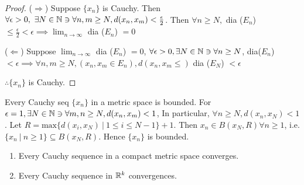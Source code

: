 \begin{proof}
	($\Rightarrow$) Suppose $\{x_n\}$ is Cauchy. Then $\forall \epsilon > 0,~\exists N \in \mathbb{N} \ni \forall n,m \geq N, d(x_n,x_m) < \frac{\epsilon}{2}$. Then $\forall n \geq N,$ dia ($E_n$) $\leq \frac{\epsilon}{2} < \epsilon \implies \lim_{n \rightarrow \infty}$ dia ($E_n$) $= 0$
	
	($\Leftarrow$) Suppose $\lim_{n \rightarrow \infty}$ dia ($E_n$) $= 0$, $\forall \epsilon > 0 ,\exists N \in \mathbb{N} \ni \forall n \geq N$, dia($E_n$) $< \epsilon \implies \forall n,m \geq N, (x_n,x_m \in E_n), d(x_n,x_m \leq )$ dia ($E_N$) $< \epsilon$ 
	
	$\therefore \{x_n\}$ is Cauchy.
\end{proof}

\begin{rmk*}
	Every Cauchy seq $\{x_n\}$ in a metric space is bounded. For $\epsilon = 1, \exists N \in \mathbb{N} \ni \forall m,n \geq N, d(x_n , x_m) < 1$, In particular, $\forall n \geq N, d(x_n,x_N) < 1$. Let $R = \text{max} \{d(x_i,x_N)~|~ 1 \leq i \leq N-1\} + 1$. Then $x_n \in B(x_N,R) \forall n \geq 1$, i.e. $\{x_n ~|~ n \geq 1\} \subseteq B(x_N,R)$. Hence $\{x_n\}$ is bounded.	
\end{rmk*}


\begin{thm}
	\begin{enumerate}[wide,label = $(\alph*)$]
		\item Every Cauchy sequence in a compact metric space converges.
		\item Every Cauchy sequence in $\mathbb{R}^k$ convergences.
	\end{enumerate}
	
\end{thm}

